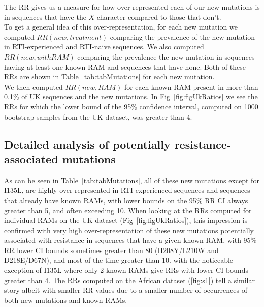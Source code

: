 \documentclass[
  11pt,
  twoside]{scrbook}
\begin{document}
The RR gives us a measure for how over-represented each of our new
mutations is in sequences that have the \(X\) character compared to those
that don't.\\
To get a general idea of this over-representation, for each new mutation
we computed \(RR(new, treatment)\) comparing the prevalence of the new
mutation in RTI-experienced and RTI-naive sequences. We also computed
\(RR(new, with RAM)\) comparing the prevalence the new mutation in
sequences having at least one known RAM and sequences that have none.
Both of these RRs are shown in
Table~\ref{tab:tabMutations}
for each new mutation.\\
We then computed \(RR(new, RAM)\) for each known RAM present in more than
0.1\% of UK sequences and the new mutations. In
Fig~\ref{fig:figUkRatios} we
see the RRs for which the lower bound of the 95\% confidence interval,
computed on 1000 bootstrap samples from the UK dataset, was greater than 4.

\hypertarget{detailed-analysis-of-potentially-resistance-associated-mutations}{%
\subsection{Detailed analysis of potentially resistance-associated mutations}\label{detailed-analysis-of-potentially-resistance-associated-mutations}}

As can be seen in Table~\ref{tab:tabMutations}, all of these new mutations except for I135L,
are highly over-represented in RTI-experienced sequences and sequences
that already have known RAMs, with lower bounds on the 95\% RR CI always
greater than 5, and often exceeding 10. When looking at the RRs computed
for individual RAMs on the UK dataset
(Fig~\ref{fig:figUkRatios}),
this impression is confirmed with very high over-representation of these
new mutations potentially associated with resistance in sequences that
have a given known RAM, with 95\% RR lower CI bounds sometimes greater
than 80 (H208Y/L210W and D218E/D67N), and most of the time greater than 10. with the noticeable exception of I135L where only 2 known RAMs give
RRs with lower CI bounds greater than 4. The RRs computed on the African
dataset (\ref{fig:s1}) tell a similar story albeit with smaller RR values due to a
smaller number of occurrences of both new mutations and known RAMs.\\
\end{document}
